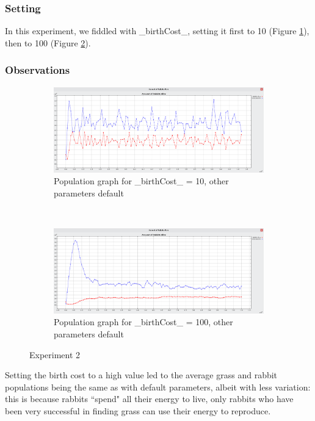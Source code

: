\documentclass[11pt]{article}
\begin{document}
\subsubsection{Setting}
In this experiment, we fiddled with _birthCost_, setting it first to 10 (Figure \ref{fig:birth-cost-10}), then to 100 (Figure \ref{fig:birth-cost-100}).

\subsubsection{Observations}

\begin{figure}[h]
    \centering
    \begin{subfigure}{\textwidth}
        \includegraphics[width = \textwidth]{birth-cost-10}
        \caption{Population graph for _birthCost_ = 10, other parameters default}
        \label{fig:birth-cost-10}
    \end{subfigure}
    ~
    \begin{subfigure}{\textwidth}
        \includegraphics[width = \textwidth]{birth-cost-100}
        \caption{Population graph for _birthCost_ = 100, other parameters default}
        \label{fig:birth-cost-100}
    \end{subfigure}
    \caption{Experiment 2}\label{fig:exp-2}
\end{figure}

Setting the birth cost to a high value led to the average grass and rabbit populations being the same as with default parameters, albeit with less variation: this is because rabbits ``spend" all their energy to live, only rabbits who have been very successful in finding grass can use their energy to reproduce.
\end{document}
